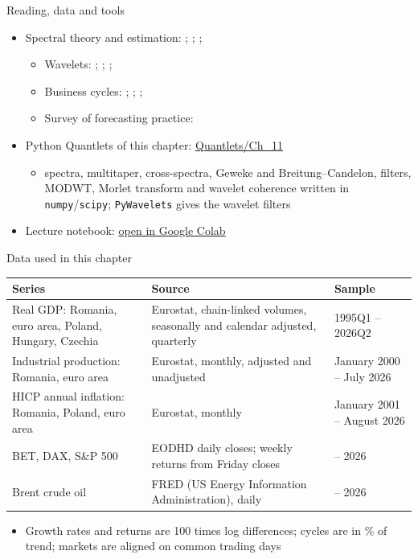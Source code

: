 \begin{frame}{Reading, data and tools}
\itemsize{\small}
\begin{itemize}
    \item Spectral theory and estimation: ; ; ; 
    \begin{itemize}
        \item Wavelets: ; ; ; 
        \item Business cycles: ; ; ; 
        \item Survey of forecasting practice: 
    \end{itemize}
    \item Python Quantlets of this chapter: \href{https://github.com/danpele/Advanced-Time-Series/tree/main/Quantlets/Ch_11}{Quantlets/Ch\_11}
    \begin{itemize}
        \item spectra, multitaper, cross-spectra, Geweke and Breitung--Candelon, filters, MODWT, Morlet transform and wavelet coherence written in \texttt{numpy}/\texttt{scipy}; \texttt{PyWavelets} gives the wavelet filters
    \end{itemize}
    \item Lecture notebook: \href{\colaburl{notebooks/EN/chapter11_lecture_notebook.ipynb}}{open in Google Colab}
\end{itemize}
\end{frame}

\begin{frame}{Data used in this chapter}
\itemsize{\footnotesize}
\begin{center}
\scriptsize
\begin{tabular}{>{\raggedright\arraybackslash}p{3.6cm}>{\raggedright\arraybackslash}p{5.0cm}>{\raggedright\arraybackslash}p{3.4cm}}
\toprule
\textbf{Series} & \textbf{Source} & \textbf{Sample} \\
\midrule
Real GDP: Romania, euro area, Poland, Hungary, Czechia & Eurostat, chain-linked volumes, seasonally and calendar adjusted, quarterly & 1995Q1 -- 2026Q2 \\
Industrial production: Romania, euro area & Eurostat, monthly, adjusted and unadjusted & January 2000 -- July 2026 \\
HICP annual inflation: Romania, Poland, euro area & Eurostat, monthly & January 2001 -- August 2026 \\
BET, DAX, S\&P 500 & EODHD daily closes; weekly returns from Friday closes & 2000 -- 2026 \\
Brent crude oil & FRED (US Energy Information Administration), daily & 2000 -- 2026 \\
\bottomrule
\end{tabular}
\end{center}
\begin{itemize}
    \item Growth rates and returns are 100 times log differences; cycles are in \% of trend; markets are aligned on common trading days
\end{itemize}
\end{frame}

